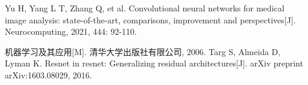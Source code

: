  
	\begin{thebibliography}{3} 
	Yu H, Yang L T, Zhang Q, et al. Convolutional neural networks for medical image analysis: state-of-the-art, comparisons, improvement and perspectives[J]. Neurocomputing, 2021, 444: 92-110.
 
	机器学习及其应用[M]. 清华大学出版社有限公司, 2006. 
	Targ S, Almeida D, Lyman K. Resnet in resnet: Generalizing residual architectures[J]. arXiv preprint arXiv:1603.08029, 2016.
	 
	
\end{thebibliography}

\newpage